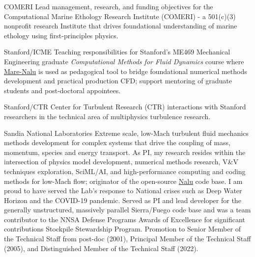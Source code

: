 \documentclass[letterpaper]{twentysecondcv_spd} %
\begin{document}
\begin{twenty}

	 {COMERI} {Lead management, research, and funding objectives for the Computational Marine Ethology Research Institute (COMERI) - a 501(c)(3) nonprofit research Institute that drives foundational understanding of marine ethology using first-principles physics.}
	
	 {Stanford/ICME} {Teaching responsibilities for Stanford's ME469 Mechanical Engineering graduate  \textit{Computational Methods for Fluid Dynamics} course where \href{https://github.com/COMERI/Mare-Nalu}{Mare-Nalu} is used as pedagogical tool to bridge foundational numerical methods development and practical production CFD; support mentoring of graduate students and post-doctoral appointees.}
	
	 {Stanford/CTR} {Center for Turbulent Research (CTR) interactions with Stanford researchers in the technical area of multiphysics turbulence research.}

	 {Sandia National Laboratories} {Extreme scale, low-Mach turbulent fluid mechanics methods development for complex systems that drive the coupling of mass, momentum, species and energy transport. As PI, my research resides within the intersection of physics model development, numerical methods research, V\&V techniques exploration, SciML/AI, and high-performance computing and coding methods for low-Mach flow; originator of the open-source \href{https://github.com/NaluCFD}{Nalu} code base. I am proud to have served the Lab's response to National crises such as Deep Water Horizon and the COVID-19 pandemic. Served as PI and lead developer for the generally unstructured, massively parallel Sierra/Fuego code base and was a team contributor to the NNSA Defense Programs Awards of Excellence for significant contributions Stockpile Stewardship Program. Promotion to Senior Member of the Technical Staff from post-doc (2001), Principal Member of the Technical Staff (2005), and Distinguished Member of the Technical Staff (2022).}
	
\end{twenty}

\end{document}
